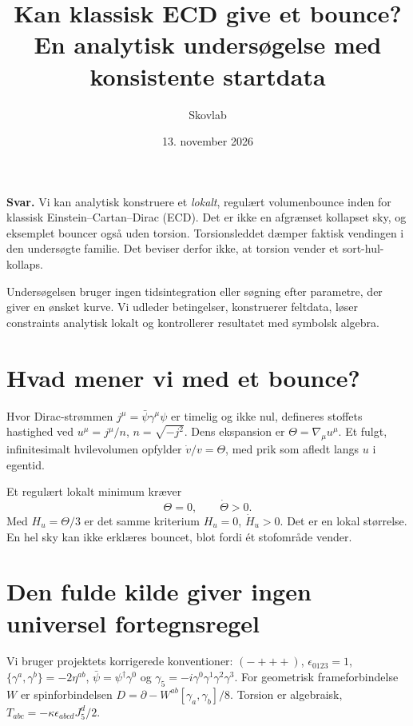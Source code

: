\documentclass[11pt,a4paper]{article}
\title{Kan klassisk ECD give et bounce?\\\large En analytisk undersøgelse med konsistente startdata}
\author{Skovlab}\date{13. november 2026}
\begin{document}
\maketitle
\textbf{Svar.} Vi kan analytisk konstruere et \emph{lokalt}, regulært volumenbounce inden for klassisk Einstein--Cartan--Dirac (ECD). Det er ikke en afgrænset kollapset sky, og eksemplet bouncer også uden torsion. Torsionsleddet dæmper faktisk vendingen i den undersøgte familie. Det beviser derfor ikke, at torsion vender et sort-hul-kollaps.

Undersøgelsen bruger ingen tidsintegration eller søgning efter parametre, der giver en ønsket kurve. Vi udleder betingelser, konstruerer feltdata, løser constraints analytisk lokalt og kontrollerer resultatet med symbolsk algebra.

\section{Hvad mener vi med et bounce?}
Hvor Dirac-strømmen $j^\mu=\bar\psi\gamma^\mu\psi$ er timelig og ikke nul, defineres stoffets hastighed ved $u^\mu=j^\mu/n$, $n=\sqrt{-j^2}$. Dens ekspansion er $\Theta=\nabla_\mu u^\mu$. Et fulgt, infinitesimalt hvilevolumen opfylder $\dot v/v=\Theta$, med prik som afledt langs $u$ i egentid.

Et regulært lokalt minimum kræver
\[
 \Theta=0,\qquad\dot\Theta>0.
\]
Med $H_u=\Theta/3$ er det samme kriterium $H_u=0$, $\dot H_u>0$. Det er en lokal størrelse. En hel sky kan ikke erklæres bouncet, blot fordi ét stofområde vender.

\section{Den fulde kilde giver ingen universel fortegnsregel}
Vi bruger projektets korrigerede konventioner: $(-+++)$, $\epsilon_{0123}=1$, $\{\gamma^a,\gamma^b\}=-2\eta^{ab}$, $\bar\psi=\psi^\dagger\gamma^0$ og $\gamma_5=-i\gamma^0\gamma^1\gamma^2\gamma^3$. For geometrisk frameforbindelse $W$ er spinforbindelsen $D=\partial-W^{ab}[\gamma_a,\gamma_b]/8$. Torsion er algebraisk, $T_{abc}=-\kappa\epsilon_{abcd}J_5^d/2$.
\end{document}
